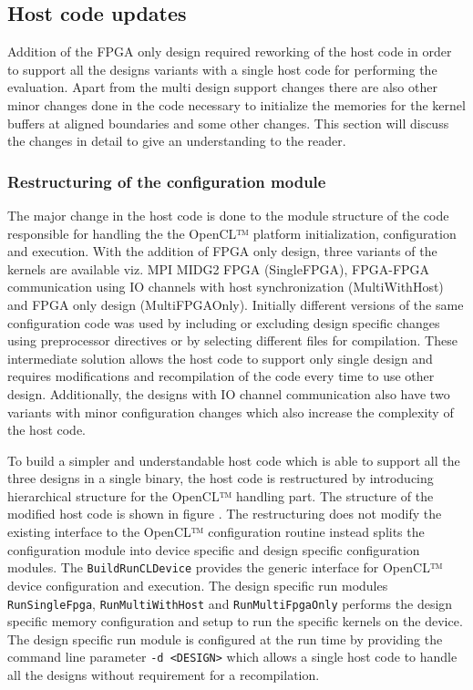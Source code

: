 \subsection{Host code updates}
\label{sec:hostcodeupdate}

Addition of the FPGA only design required reworking of the host code in order to
support all the designs variants with a single host code for performing the evaluation.
Apart from the multi design support changes there are also other minor changes done in the code necessary
to initialize the memories for the kernel buffers at aligned boundaries and some other
changes. This section will discuss the changes in detail to give an understanding
to the reader.

\subsubsection*{Restructuring of the configuration module}

The major change in the host code is done to the module structure of
the code responsible for handling the the OpenCL™ platform initialization,
configuration and execution. With the addition of FPGA only design,
three variants of the kernels are available viz. MPI MIDG2 FPGA (SingleFPGA),
FPGA-FPGA communication using IO channels with host synchronization (MultiWithHost)
and FPGA only design (MultiFPGAOnly). Initially different versions of the same
configuration code was used by including or excluding design specific changes
using preprocessor directives or by selecting different files for compilation.
These intermediate solution allows the host code to support only single design
and requires modifications and recompilation of the code every time to use other
design. Additionally, the designs with IO channel communication also have two variants
with minor configuration changes which also increase the complexity of the host code.

To build a simpler and understandable host code which is able to support all the three
designs in a single binary, the host code is restructured by introducing hierarchical
structure for the OpenCL™ handling part. The structure of the modified host code is
shown in figure {}. The restructuring does not modify the existing interface to the
OpenCL™ configuration routine instead splits the configuration module into device
specific and design specific configuration modules. The \texttt{BuildRunCLDevice}
provides the generic interface for OpenCL™ device configuration and execution.
The design specific run modules \texttt{RunSingleFpga}, \texttt{RunMultiWithHost}
and \texttt{RunMultiFpgaOnly} performs the design specific memory configuration
and setup to run the specific kernels on the device. The design specific run module
is configured at the run time by providing the command line parameter
\texttt{-d <DESIGN>} which allows a single host code to handle all the designs
without requirement for a recompilation.

